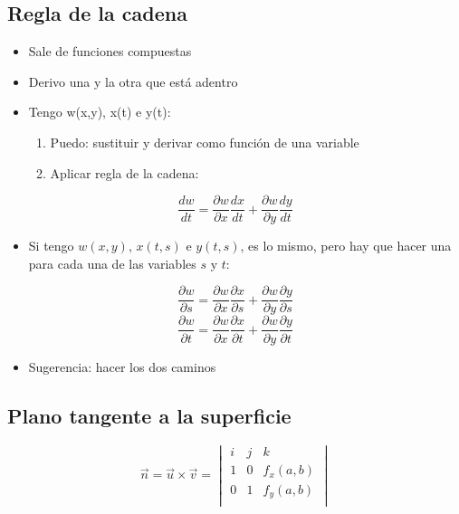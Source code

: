 \subsection{Regla de la cadena}
\begin{itemize}
    \item Sale de funciones compuestas
    \item Derivo una y la otra que está adentro
    \item Tengo w(x,y), x(t) e y(t):
          \begin{enumerate}
              \item Puedo: sustituir y derivar como función de una variable
              \item Aplicar regla de la cadena:
          \end{enumerate}
\end{itemize}
\begin{equation*}
    \frac{dw}{dt} = \frac{\partial w}{\partial x}\frac{dx}{dt} + \frac{\partial w}{\partial y}\frac{dy}{dt}
\end{equation*}
\begin{itemize}
    \item Si tengo \(w(x,y)\), \(x(t,s)\) e \(y(t,s)\), es lo mismo,
          pero hay que hacer una para cada una de las variables \(s\) y \(t\):
\end{itemize}
\begin{equation*}
    \frac{\partial w}{\partial s} = \frac{\partial w}{\partial x}\frac{\partial x}{\partial s} + \frac{\partial w}{\partial y}\frac{\partial y}{\partial s}
\end{equation*}
\begin{equation*}
    \frac{\partial w}{\partial t} = \frac{\partial w}{\partial x}\frac{\partial x}{\partial t} + \frac{\partial w}{\partial y}\frac{\partial y}{\partial t}
\end{equation*}
\begin{itemize}
    \item Sugerencia: hacer los dos caminos
\end{itemize}

\subsection{Plano tangente a la superficie}
\begin{equation*}
    \vec{n}= \vec{u}\times\vec{v} = \begin{vmatrix}
        i & j & k \\ 1 & 0 & f_x(a,b) \\ 0 & 1 & f_y(a,b) \\
    \end{vmatrix}
\end{equation*}

